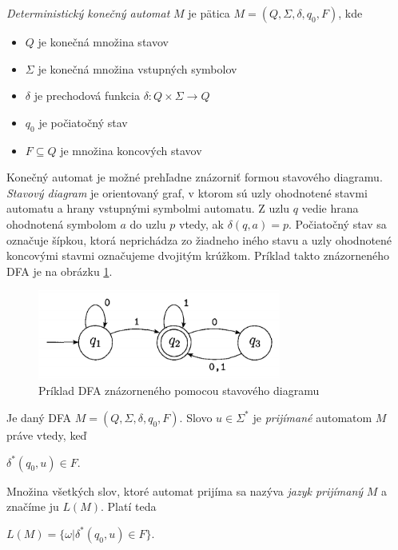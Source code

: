 \begin{definice}
\textit{Deterministický konečný automat} $M$ je pätica $M = (Q,\Sigma,\delta, q_0, F)$, kde
\begin{itemize}
\item $Q$ je konečná množina stavov
\item $\Sigma$ je konečná množina vstupných symbolov
\item $\delta$ je prechodová funkcia $\delta: Q \times \Sigma \rightarrow Q$
\item $q_0$ je počiatočný stav
\item $F \subseteq Q$ je množina koncových stavov \cite{demlova:automaty}
\end{itemize}
\end{definice}

Konečný automat je možné prehľadne znázorniť formou stavového diagramu. \textit{Stavový diagram} je orientovaný graf, v ktorom sú uzly ohodnotené stavmi automatu a hrany vstupnými symbolmi automatu. Z uzlu $q$ vedie hrana ohodnotená symbolom $a$ do uzlu $p$ vtedy, ak $\delta(q,a) = p$. Počiatočný stav sa označuje šípkou, ktorá neprichádza zo žiadneho iného stavu a uzly ohodnotené koncovými stavmi označujeme dvojitým krúžkom. Príklad takto znázorneného DFA je na obrázku \ref{fig:DFA_example}.

\begin{figure}[H]
\begin{center}
\includegraphics[width=8cm]{figures/DFA_example.PNG}
\caption{Príklad DFA znázorneného pomocou stavového diagramu}
\label{fig:DFA_example}
\end{center}
\end{figure}

\begin{definice}\label{def:regular_language}
Je daný DFA $M = (Q,\Sigma,\delta, q_0, F)$. Slovo $u \in \Sigma^*$ je \textit{prijímané} automatom $M$ práve vtedy, keď
\begin{center}
$\delta^*(q_0,u) \in F$.
\end{center}
Množina všetkých slov, ktoré automat prijíma sa nazýva \textit{jazyk prijímaný} $M$ a značíme ju $L(M)$. Platí teda
\begin{center}
$L(M) = \{\omega|\delta^*(q_0,u) \in F\}$.\cite{demlova:automaty}
\end{center}
\end{definice}

